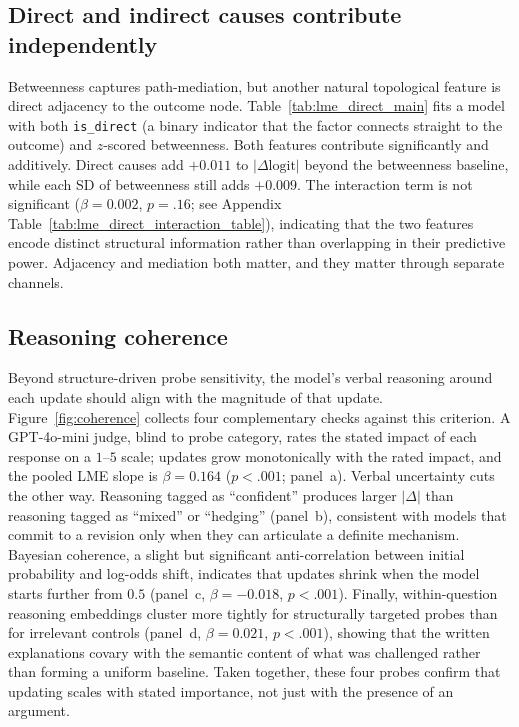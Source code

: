 \documentclass[11pt]{article}
\begin{document}
\subsection{Direct and indirect causes contribute independently}
\label{sec:results-direct}

Betweenness captures path-mediation, but another natural topological feature is direct adjacency to the outcome node. Table~\ref{tab:lme_direct_main} fits a model with both \texttt{is\_direct} (a binary indicator that the factor connects straight to the outcome) and $z$-scored betweenness. Both features contribute significantly and additively. Direct causes add $+0.011$ to $|\Delta\text{logit}|$ beyond the betweenness baseline, while each SD of betweenness still adds $+0.009$. The interaction term is not significant ($\beta = 0.002$, $p = .16$; see Appendix Table~\ref{tab:lme_direct_interaction_table}), indicating that the two features encode distinct structural information rather than overlapping in their predictive power. Adjacency and mediation both matter, and they matter through separate channels.

\subsection{Reasoning coherence}
\label{sec:results-coherence}

Beyond structure-driven probe sensitivity, the model's verbal reasoning around each update should align with the magnitude of that update. Figure~\ref{fig:coherence} collects four complementary checks against this criterion. A GPT-4o-mini judge, blind to probe category, rates the stated impact of each response on a $1$--$5$ scale; updates grow monotonically with the rated impact, and the pooled LME slope is $\beta = 0.164$ ($p < .001$; panel~a). Verbal uncertainty cuts the other way. Reasoning tagged as ``confident'' produces larger $|\Delta|$ than reasoning tagged as ``mixed'' or ``hedging'' (panel~b), consistent with models that commit to a revision only when they can articulate a definite mechanism. Bayesian coherence, a slight but significant anti-correlation between initial probability and log-odds shift, indicates that updates shrink when the model starts further from $0.5$ (panel~c, $\beta = -0.018$, $p < .001$). Finally, within-question reasoning embeddings cluster more tightly for structurally targeted probes than for irrelevant controls (panel~d, $\beta = 0.021$, $p < .001$), showing that the written explanations covary with the semantic content of what was challenged rather than forming a uniform baseline. Taken together, these four probes confirm that updating scales with stated importance, not just with the presence of an argument.
\end{document}
